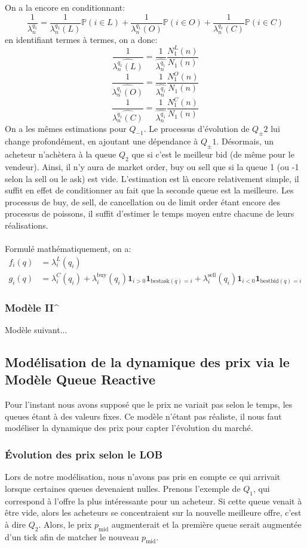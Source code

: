 \documentclass[12pt,a4paper]{article}
\theoremstyle{definition}
\theoremstyle{remark}
\begin{document}
    On a la encore en conditionnant:
    $$\frac{1}{{\lambda^{q_1}_n}}=\frac{1}{{\lambda^{q_1}_n(L)}}\mathbb{P}(i\in L)+\frac{1}{{\lambda^{q_1}_n(O)}}\mathbb{P}(i\in O)+\frac{1}{{\lambda^{q_1}_n(C)}}\mathbb{P}(i\in C)$$
    en identifiant termes à termes, on a donc:
    $$\frac{1}{\hat{\lambda^{q_1}_n(L)}}=\frac{1}{\hat{\lambda^{q_1}_n}}\frac{N_1^L(n)}{N_1(n)}$$
    $$\frac{1}{\hat{\lambda^{q_1}_n(O)}}=\frac{1}{\hat{\lambda^{q_1}_n}}\frac{N_1^O(n)}{N_1(n)}$$
    $$\frac{1}{\hat{\lambda^{q_1}_n(C)}}=\frac{1}{\hat{\lambda^{q_1}_n}}\frac{N_1^C(n)}{N_1(n)}$$
    On a les mêmes estimations pour $Q_{-1}$.
    Le processus d'évolution de $Q_\pm2$ lui change profondément, en ajoutant une dépendance à $Q_\pm1$.
    Désormais, un acheteur n’achètera à la queue $Q_2$ que si c'est le meilleur bid (de même pour le vendeur). Ainsi, il n'y aura de market order, buy ou sell que si la queue 1 (ou -1 selon la sell ou le ask) est vide. 
    L'estimation est là encore relativement simple, il suffit en effet de conditionner au fait que la seconde queue est la meilleure. Les processus de buy, de sell, de cancellation ou de limit order étant encore des processus de poissons, il suffit d'estimer le temps moyen entre chacune de leurs réalisations.
    \\
    \\
    Formulé mathématiquement, on a:
    $$\begin{aligned}
    f_i(q) &= \lambda_i^L(q_i)\\
    g_i(q) &= \lambda_i^C(q_i)+\lambda_i^{\text{buy}}(q_i)\textbf{1}_{i>0}\textbf{1}_{\text{bestask}(q)=i}+\lambda_i^{\text{sell}}(q_i)\textbf{1}_{i<0}\textbf{1}_{\text{bestbid}(q)=i}
    \end{aligned}$$

    \subsubsection{Modèle II^{}}
    Modèle suivant...
    \subsection{Modélisation de la dynamique des prix via le Modèle Queue Reactive}

    Pour l'instant nous avons supposé que le prix ne variait pas selon le temps, les queues étant à des valeurs fixes. Ce modèle n'étant pas réaliste, il nous faut modéliser la dynamique des prix pour capter l'évolution du marché. 
    \subsubsection{Évolution des prix selon le LOB}
    Lors de notre modélisation, nous n'avons pas pris en compte ce qui arrivait lorsque certaines queues devenaient nulles. Prenons l'exemple de $Q_1$, qui correspond à l'offre la plus intéressante pour un acheteur. Si cette queue venait à être vide, alors les acheteurs se concentraient sur la nouvelle meilleure offre, c'est à dire $Q_2$. Alors, le prix $p_{\text{mid}}$ augmenterait et la première queue serait augmentée d'un tick afin de matcher le nouveau $p_{\text{mid}}$.
\end{document}
